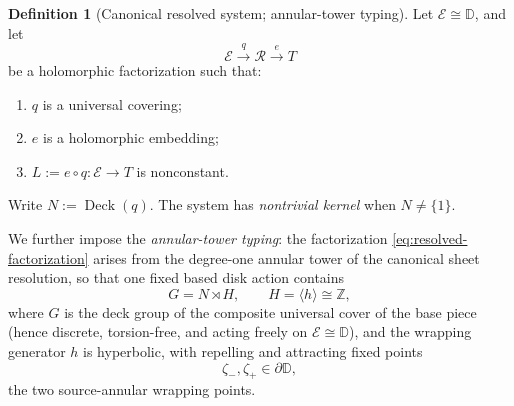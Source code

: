 \documentclass[11pt,reqno]{amsart}
\theoremstyle{definition}
\newtheorem{definition}[theorem]{Definition}
\theoremstyle{remark}
\begin{document}
\begin{definition}[Canonical resolved system; annular-tower typing]\label{def:canonical-resolved-system}
Let \(\mathcal E\cong\mathbb D\), and let
\begin{equation}\label{eq:resolved-factorization}
\mathcal E \xrightarrow{\ q\ } \mathcal R \xrightarrow{\ e\ } T
\end{equation}
be a holomorphic factorization such that:
\begin{enumerate}
\item \(q\) is a universal covering;
\item \(e\) is a holomorphic embedding;
\item \(L:=e\circ q\colon\mathcal E\to T\) is nonconstant.
\end{enumerate}
Write \(N:=\operatorname{Deck}(q)\).  The system has \emph{nontrivial kernel} when \(N\ne\{1\}\).

We further impose the \emph{annular-tower typing}: the factorization \eqref{eq:resolved-factorization} arises from the degree-one annular tower of the canonical sheet resolution, so that one fixed based disk action contains
\begin{equation}\label{eq:semidirect}
G=N\rtimes H,\qquad H=\langle h\rangle\cong\mathbb Z,
\end{equation}
where \(G\) is the deck group of the composite universal cover of the base piece (hence discrete, torsion-free, and acting freely on \(\mathcal E\cong\mathbb D\)), and the wrapping generator \(h\) is hyperbolic, with repelling and attracting fixed points
\begin{equation}\label{eq:wrapping-points}
\zeta_-,\zeta_+\in\partial\mathbb D,
\end{equation}
the two source-annular wrapping points.
\end{definition}
\end{document}
